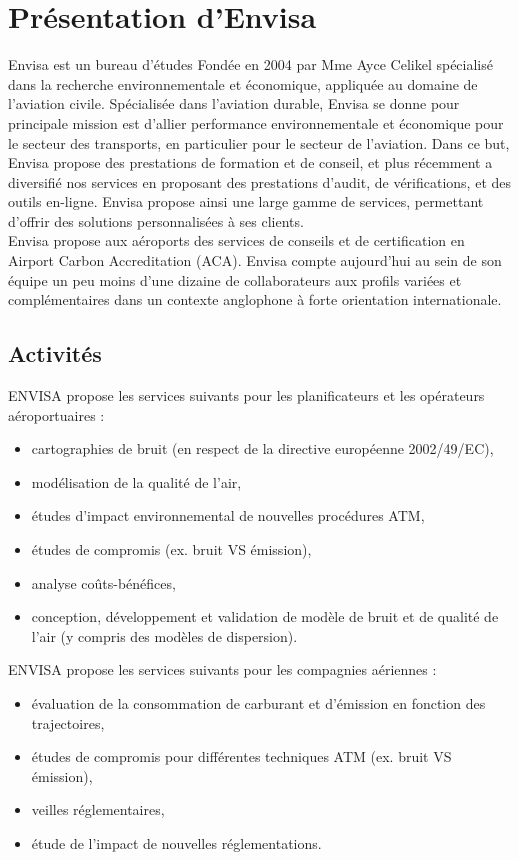 \documentclass[a4paper,12pt,twoside]{article}
\begin{document}
    \section{Présentation d'Envisa}
    Envisa est un bureau d’études Fondée en 2004 par Mme Ayce Celikel spécialisé dans la recherche environnementale et économique, appliquée au domaine de l’aviation civile. Spécialisée dans l'aviation durable, Envisa se donne pour principale mission  est d'allier performance environnementale et économique pour le secteur des transports, en particulier pour le secteur de l'aviation. Dans ce but, Envisa propose des prestations de formation et de conseil, et plus récemment a diversifié nos services en proposant des prestations d'audit, de vérifications, et des outils en-ligne. Envisa propose ainsi une large gamme de services, permettant d'offrir des solutions personnalisées à ses clients.\\
    Envisa propose aux aéroports des services de conseils et de certification en Airport Carbon Accreditation (ACA). Envisa compte aujourd'hui au sein de son équipe un peu moins d'une dizaine de collaborateurs aux profils variées et complémentaires dans un contexte anglophone à forte orientation internationale.
    \subsection*{Activités}
    ENVISA propose les services suivants pour les planificateurs et les opérateurs aéroportuaires :
    \begin{itemize}
    	\item cartographies de bruit (en respect de la directive européenne 2002/49/EC),
    	\item modélisation de la qualité de l'air,
    	\item études d'impact environnemental de nouvelles procédures ATM,
    	\item études de compromis (ex. bruit VS émission),
    	\item analyse coûts-bénéfices,
    	\item conception, développement et validation de modèle de bruit et de qualité de l'air (y compris des modèles de dispersion).
    \end{itemize}
    
    ENVISA propose les services suivants pour les compagnies aériennes :
    \begin{itemize}
    	\item évaluation de la consommation de carburant et d'émission en fonction des trajectoires,
    	\item études de compromis pour différentes techniques ATM  (ex. bruit VS émission),
    	\item veilles réglementaires,
    	\item étude de l'impact de nouvelles réglementations.
    \end{itemize}
    
\end{document}
